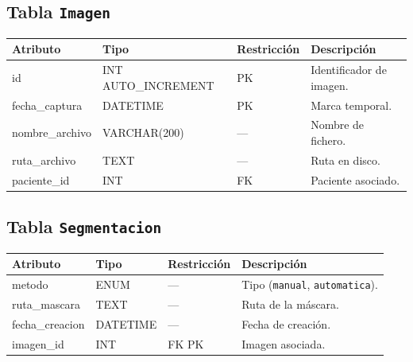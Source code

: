 \subsection*{Tabla \texttt{Imagen}}
{\footnotesize
\begin{tabularx}{\textwidth}{l l l X}
\hline
\textbf{Atributo} & \textbf{Tipo}            & \textbf{Restricción} & \textbf{Descripción} \\\hline
id               & INT AUTO\_INCREMENT      & PK                   & Identificador de imagen. \\
fecha\_captura   & DATETIME                 & PK                   & Marca temporal. \\
nombre\_archivo  & VARCHAR(200)             & —                    & Nombre de fichero. \\
ruta\_archivo    & TEXT                     & —                    & Ruta en disco. \\
paciente\_id     & INT                      & FK                   & Paciente asociado. \\\hline
\end{tabularx}
}

\subsection*{Tabla \texttt{Segmentacion}}
{\footnotesize
\begin{tabularx}{\textwidth}{l l l X}
\hline
\textbf{Atributo} & \textbf{Tipo}            & \textbf{Restricción} & \textbf{Descripción} \\\hline
metodo           & ENUM                      & —                    & Tipo (\texttt{manual}, \texttt{automatica}). \\
ruta\_mascara    & TEXT                     & —                    & Ruta de la máscara. \\
fecha\_creacion  & DATETIME                 & —                    & Fecha de creación. \\
imagen\_id       & INT                      & FK PK                  & Imagen asociada. \\\hline
\end{tabularx}
}

